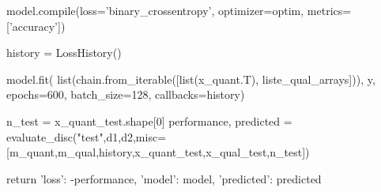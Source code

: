 \begin{pylisting}
    model.compile(loss='binary_crossentropy', optimizer=optim, metrics=['accuracy'])

    history = LossHistory()
    
    model.fit(
      list(chain.from_iterable([list(x_quant.T), liste_qual_arrays])),
      y,
      epochs=600,
      batch_size=128,
      callbacks=history)

    n_test = x_quant_test.shape[0]
    performance, predicted = evaluate_disc("test",d1,d2,misc=[m_quant,m_qual,history,x_quant_test,x_qual_test,n_test])
  
    return {'loss': -performance, 'model': model, 'predicted': predicted}

\end{pylisting}

\printbibliography[heading=subbibliography, title=References of Appendix B]
